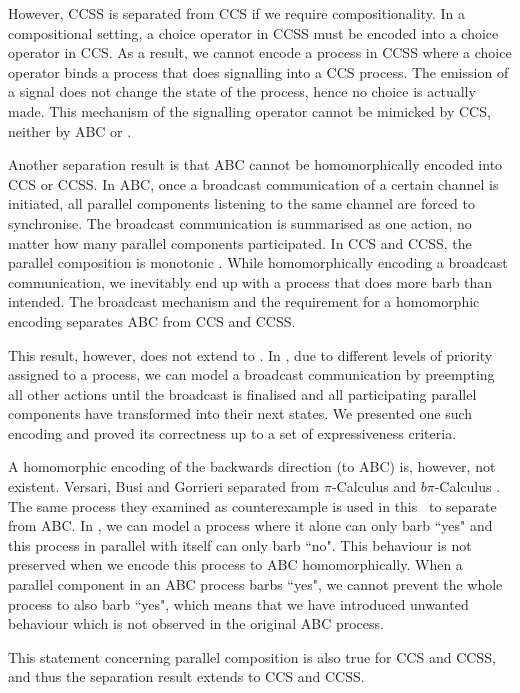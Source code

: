 \documentclass[adraft,hidelinks]{eptcs}
\begin{document}
However, CCSS is separated from CCS if we require compositionality.
In a compositional setting, a choice operator in CCSS must be encoded into a choice operator in CCS.
As a result, we cannot encode a process in CCSS where a choice operator binds a process that does signalling into a CCS process.
The emission of a signal does not change the state of the process, hence no choice is actually made.
This mechanism of the signalling operator cannot be mimicked by CCS, neither by ABC or \CSG.

Another separation result is that ABC cannot be homomorphically encoded into CCS or CCSS.
In ABC, once a broadcast communication of a certain channel is initiated, all parallel components listening to the same channel are forced to synchronise.
The broadcast communication is summarised as one action, no matter how many parallel components participated.
In CCS and CCSS, the parallel composition is monotonic \cite{PP16}.
While homomorphically encoding a broadcast communication, we inevitably end up with a process that does more barb than intended.
The broadcast mechanism and the requirement for a homomorphic encoding separates ABC from CCS and CCSS.

This result, however, does not extend to \CSG.
In \CSG, due to different levels of priority assigned to a process, we can model a broadcast communication by preempting all other actions until the broadcast is finalised and all participating parallel components have transformed into their next states.
We presented one such encoding and proved its correctness up to a set of expressiveness criteria.

A homomorphic encoding of the backwards direction (\CSG to ABC) is, however, not existent.
Versari, Busi and Gorrieri separated \CSG from $\pi$-Calculus and $b\pi$-Calculus \cite{VBG09}.
The same process they examined as counterexample is used in this \this\ to separate \CSG from ABC.
In \CSG, we can model a process where it alone can only barb ``yes" and this process in parallel with itself can only barb ``no".
This behaviour is not preserved when we encode this process to ABC homomorphically.
When a parallel component in an ABC process barbs ``yes", we cannot prevent the whole process to also barb ``yes", which means that we have introduced unwanted behaviour which is not observed in the original ABC process.

This statement concerning parallel composition is also true for CCS and CCSS, and thus the separation result extends to CCS and CCSS.
\end{document}
